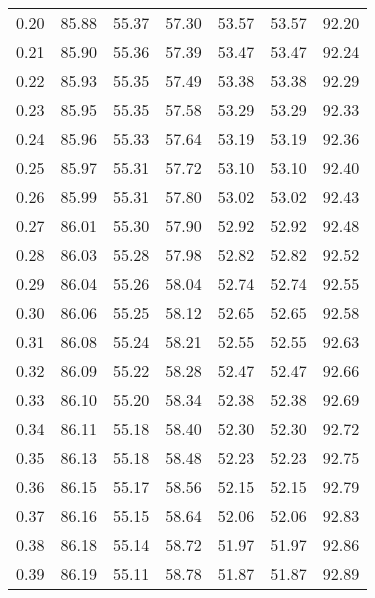 \begin{tabular}{|c|c|c|c|c|c|c|}
      0.20 &     85.88 &     55.37 &      57.30 &   53.57 &      53.57 &         92.20 \\
      0.21 &     85.90 &     55.36 &      57.39 &   53.47 &      53.47 &         92.24 \\
      0.22 &     85.93 &     55.35 &      57.49 &   53.38 &      53.38 &         92.29 \\
      0.23 &     85.95 &     55.35 &      57.58 &   53.29 &      53.29 &         92.33 \\
      0.24 &     85.96 &     55.33 &      57.64 &   53.19 &      53.19 &         92.36 \\
      0.25 &     85.97 &     55.31 &      57.72 &   53.10 &      53.10 &         92.40 \\
      0.26 &     85.99 &     55.31 &      57.80 &   53.02 &      53.02 &         92.43 \\
      0.27 &     86.01 &     55.30 &      57.90 &   52.92 &      52.92 &         92.48 \\
      0.28 &     86.03 &     55.28 &      57.98 &   52.82 &      52.82 &         92.52 \\
      0.29 &     86.04 &     55.26 &      58.04 &   52.74 &      52.74 &         92.55 \\
      0.30 &     86.06 &     55.25 &      58.12 &   52.65 &      52.65 &         92.58 \\
      0.31 &     86.08 &     55.24 &      58.21 &   52.55 &      52.55 &         92.63 \\
      0.32 &     86.09 &     55.22 &      58.28 &   52.47 &      52.47 &         92.66 \\
      0.33 &     86.10 &     55.20 &      58.34 &   52.38 &      52.38 &         92.69 \\
      0.34 &     86.11 &     55.18 &      58.40 &   52.30 &      52.30 &         92.72 \\
      0.35 &     86.13 &     55.18 &      58.48 &   52.23 &      52.23 &         92.75 \\
      0.36 &     86.15 &     55.17 &      58.56 &   52.15 &      52.15 &         92.79 \\
      0.37 &     86.16 &     55.15 &      58.64 &   52.06 &      52.06 &         92.83 \\
      0.38 &     86.18 &     55.14 &      58.72 &   51.97 &      51.97 &         92.86 \\
      0.39 &     86.19 &     55.11 &      58.78 &   51.87 &      51.87 &         92.89 \\

\end{tabular}
